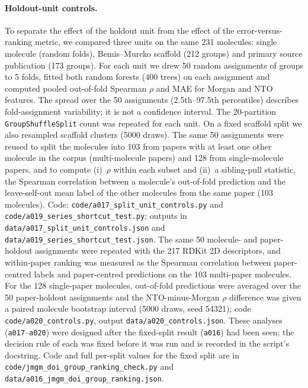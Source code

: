 \paragraph{Holdout-unit controls.}
To separate the effect of the holdout unit from the effect of the error-versus-ranking metric,
we compared three units on the same \num{231} molecules: single molecule (random
folds), Bemis--Murcko scaffold (\num{212} groups) and primary source publication
(\num{173} groups). For each unit we drew \num{50} random assignments of groups to
\num{5} folds, fitted both random forests (\num{400} trees) on each assignment and
computed pooled out-of-fold Spearman $\rho$ and MAE for Morgan and NTO features. The
spread over the \num{50} assignments (2.5th--97.5th percentiles) describes
fold-assignment variability; it is not a confidence interval. The \num{20}-partition
\texttt{GroupShuffleSplit} count was repeated for each unit. On a fixed scaffold split we
also resampled scaffold clusters (\num{5000} draws). The same \num{50} assignments were
reused to split the molecules into \num{103} from papers with at least one other molecule
in the corpus (multi-molecule papers) and \num{128} from single-molecule papers, and
to compute (i)~$\rho$ within each subset and (ii)~a sibling-pull statistic, the Spearman
correlation between a molecule's out-of-fold prediction and the leave-self-out mean
label of the other molecules from the same paper (\num{103} molecules). Code:
\texttt{code/a017\_split\_unit\_controls.py} and
\texttt{code/a019\_series\_shortcut\_test.py}; outputs in
\texttt{data/a017\_split\_unit\_controls.json} and
\texttt{data/a019\_series\_shortcut\_test.json}. The same \num{50} molecule- and
paper-holdout assignments were repeated with the \num{217} RDKit 2D descriptors, and
within-paper ranking was measured as the Spearman correlation between paper-centred
labels and paper-centred predictions on the \num{103} multi-paper molecules. For the
\num{128} single-paper molecules, out-of-fold predictions were averaged over the \num{50}
paper-holdout assignments and the NTO-minus-Morgan $\rho$ difference was given a paired
molecule bootstrap interval (\num{5000} draws, seed \num{54321}); code
\texttt{code/a020\_controls.py}, output \texttt{data/a020\_controls.json}. These analyses
(\texttt{a017}--\texttt{a020}) were designed after the fixed-split result
(\texttt{a016}) had been seen; the decision rule of each was fixed before it was run and
is recorded in the script's docstring. Code and full per-split values for
the fixed split are in \texttt{code/jmgm\_doi\_group\_ranking\_check.py} and
\texttt{data/a016\_jmgm\_doi\_group\_ranking.json}.

